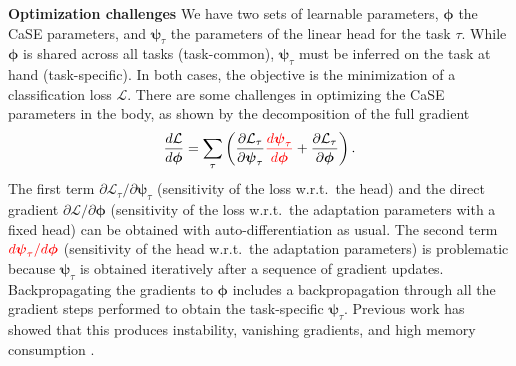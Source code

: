 \documentclass{article}
\makeatletter
\def\mathcolor#1#{\@mathcolor{#1}}
\def\@mathcolor#1#2#3{\protect\leavevmode
  \begingroup
    \color#1{#2}#3\endgroup
}
\makeatother
\begin{document}
\textbf{Optimization challenges} We have two sets of learnable parameters, $\boldsymbol{\phi}$ the CaSE parameters, and $\boldsymbol{\psi}_\tau$ the parameters of the linear head for the task $\tau$. While $\boldsymbol{\phi}$ is shared across all tasks (task-common), $\boldsymbol{\psi}_\tau$ must be inferred on the task at hand (task-specific). In both cases, the objective is the minimization of a classification loss $\mathcal{L}$. There are some challenges in optimizing the CaSE parameters in the body, as shown by the decomposition of the full gradient
\begin{equation} \label{eq:full_gradient}
    \frac{d \mathcal{L}}{d \boldsymbol{\phi}} = \sum_\tau \left(
    \frac{\partial \mathcal{L}_\tau}{\partial \boldsymbol{\psi}_\tau} 
    \mathcolor{red}{\frac{d \boldsymbol{\psi}_\tau}{d \boldsymbol{\phi}}} +
    \frac{\partial \mathcal{L}_\tau}{\partial \boldsymbol{\phi}} \right).
\end{equation}
The first term $\partial \mathcal{L}_\tau / \partial \boldsymbol{\psi}_\tau$ (sensitivity of the loss w.r.t.~the head) and the direct gradient $\partial \mathcal{L} / \partial \boldsymbol{\phi}$ (sensitivity of the loss w.r.t.~the adaptation parameters with a fixed head) can be obtained with auto-differentiation as usual. The second term $\mathcolor{red}{d \boldsymbol{\psi}_\tau / d \boldsymbol{\phi}}$ (sensitivity of the head w.r.t.~the adaptation parameters) is problematic because $\boldsymbol{\psi}_\tau$ is obtained iteratively after a sequence of gradient updates. Backpropagating the gradients to $\boldsymbol{\phi}$ includes a backpropagation through all the gradient steps performed to obtain the task-specific $\boldsymbol{\psi}_\tau$. Previous work has showed that this produces instability, vanishing gradients, and high memory consumption \citep{antoniou2018train, rajeswaran2019meta}.
\end{document}
